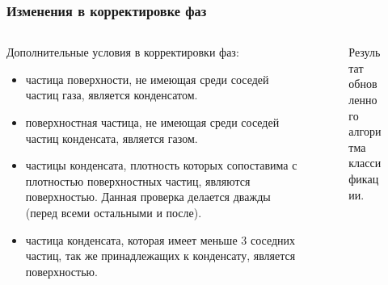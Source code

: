 \documentclass[pdf,hyperref={unicode}]{beamer}
\begin{document}
\begin{frame}
\transdissolve[duration=0.2]
\frametitle{Изменения в корректировке фаз}

\begin{columns}

\begin{column}{0.47\linewidth}
\tiny{
Дополнительные условия в корректировки фаз:
\begin{itemize}
\item частица поверхности, не имеющая среди соседей частиц газа, является конденсатом.
\item поверхностная частица, не имеющая среди соседей частиц конденсата, является газом.
\item частицы конденсата, плотность которых сопоставима с плотностью поверхностных частиц, являются поверхностью. Данная проверка делается дважды (перед всеми остальными и после).
\item частица конденсата, которая имеет меньше 3 соседних частиц, так же принадлежащих к конденсату, является поверхностью.
\end{itemize}
}
\end{column}


\begin{column}{0.47\linewidth}

\begin{figure}[h]
\caption{\tiny Результат обновленного алгоритма классификации.}
\end{figure}

\end{column}

\end{columns}

\end{frame}
\end{document}
